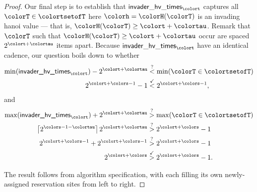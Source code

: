 \begin{proof}
Our final step is to establish that $\mathsf{invader\_hv\_times}_{\colort}$ captures all $\colorT \in \colortsetofT$ here $\colorh = \colorH(\colorT)$ is an invading hanoi value --- that is, $\colorH(\colorT) \geq \colort + \colortau$.
Remark that $\colorT$ such that $\colorH(\colorT) \geq \colort + \colortau$ occur are spaced $2^{\colort + \colortau}$ items apart.
Because $\mathsf{invader\_hv\_times}_{\colort}$ have an identical cadence, our question boils down to whether
\begin{align*}
\min(\textsf{invader\_hv\_times}_{\colort})
- 2^{\colort + \colortau}
&\stackrel{?}{<}
\min(\colorT \in \colortsetofT)\\
2^{\colort + \colors - 1} - 1
&\stackrel{\checkmark}{<}
2^{\colort + \colors - 1},
\end{align*}
and
\begin{align*}
\max(\textsf{invader\_hv\_times}_{\colort})
+ 2^{\colort + \colortau}
&\stackrel{?}{>}
\max(\colorT \in \colortsetofT)\\
\left\lceil 2^{\colors - 1 - \colortau}\right\rceil 2^{\colort + \colortau}
&\stackrel{?}{>}
2^{\colort + \colors} - 1\\
2^{\colort + \colors - 1}
+ 2^{\colort + \colors - 1}
&\stackrel{?}{>}
2^{\colort + \colors} - 1\\
2^{\colort + \colors}
&\stackrel{\checkmark}{>}
2^{\colort + \colors} - 1.
\end{align*}

The result follows from algorithm specification, with each \hv{} filling its own newly-assigned reservation sites from left to right.
\end{proof}
